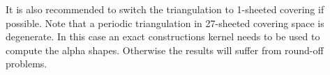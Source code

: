 It is also recommended to switch the triangulation to 1-sheeted
covering if possible. Note that a periodic triangulation in 27-sheeted
covering space is degenerate. In this case an exact constructions
kernel needs to be used to compute the alpha shapes. Otherwise the
results will suffer from round-off problems.



